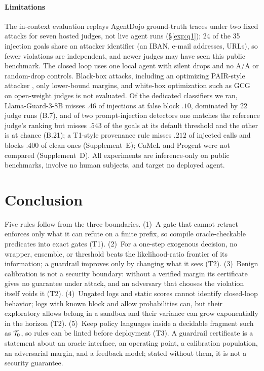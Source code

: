\paragraph{Limitations}
The in-context evaluation replays AgentDojo ground-truth traces under two fixed attacks
for seven hosted judges, not live agent runs (\S\ref{exp:q1}); 24 of the 35 injection goals share
an attacker identifier (an IBAN, e-mail addresses, URLs), so fewer violations are independent, and
newer judges may have seen this public benchmark. The closed loop uses one local agent with
silent drops and no A/A or random-drop controls.
Black-box attacks, including an optimizing PAIR-style attacker \citep{chao2025pair}, only
lower-bound margins, and white-box optimization such as GCG \citep{zou2023universal} on
open-weight judges is not evaluated. Of
the dedicated classifiers we ran, Llama-Guard-3-8B \citep{inan2023llamaguard}
misses $.46$ of injections at false block $.10$, dominated by 22 judge runs (B.7), and of two
prompt-injection detectors one matches the reference judge's ranking but misses $.543$ of the
goals at its default threshold and the other is at chance (B.21); a T1-style provenance rule
misses $.212$ of injected calls and blocks $.400$ of clean ones (Supplement~E); CaMeL and Progent were not compared
(Supplement~D). All experiments are inference-only on public benchmarks, involve no
human subjects, and target no deployed agent.

\section{Conclusion}
Five rules follow from the three boundaries. (1)~A gate that cannot retract enforces only
what it can refute on a finite prefix, so compile oracle-checkable predicates into exact
gates (T1). (2)~For a one-step exogenous decision, no wrapper, ensemble, or threshold beats the
likelihood-ratio frontier of its information; a guardrail improves only by changing what it
sees (T2). (3)~Benign
calibration is not a security boundary: without a verified margin its certificate gives no
guarantee under attack, and an adversary that chooses the violation itself voids it (T2).
(4)~Ungated logs and static scores cannot identify closed-loop behavior; logs with known block
and allow probabilities can, but their exploratory allows belong in a sandbox and their variance
can grow exponentially in the horizon (T2). (5)~Keep policy languages inside a decidable
fragment such as $\mathcal{T}_0$, so rules can be linted before deployment (T3). A guardrail
certificate is a statement about an oracle interface, an operating point, a calibration
population, an adversarial margin, and a feedback model; stated without them, it is not a
security guarantee.
